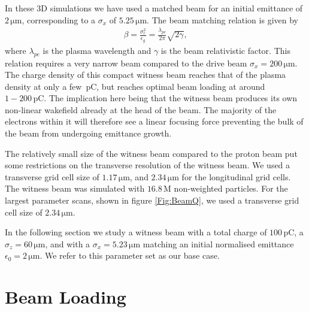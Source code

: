 \documentclass[aps,prstab,reprint,amsmath,amssymb,groupedaddress]{revtex4-1}
\newcommand{\unit}[1]{\,\mathrm{#1}}
\begin{document}
In these 3D simulations we have used a matched beam for an initial emittance of $2\unit{\mu m}$, corresponding to a
$\sigma_{x}$ of $5.25\unit{\mu m}$. The beam matching relation is given by
\begin{align}
    \beta = \frac{\sigma_r^2}{\epsilon_g} = \frac{\lambda_{pe}}{2\pi}\sqrt{2\gamma}, \label{EQ:Matched}
\end{align}
where $\lambda_{pe}$ is the plasma wavelength and $\gamma$ is the beam relativistic factor. This relation requires a
very narrow beam compared to the drive beam $\sigma_{x} = 200\unit{\mu m}$. The charge density of this compact witness
beam reaches that of the plasma density at only a few $\unit{pC}$, but reaches optimal beam loading at around
$1-200\unit{pC}$. The implication here being that the witness beam produces its own non-linear wakefield already at the
head of the beam. The majority of the electrons within it will therefore see a linear focusing force preventing the bulk
of the beam from undergoing emittance growth.

The relatively small size of the witness beam compared to the proton beam put some restrictions on the transverse
resolution of the witness beam. We used a transverse grid cell size of $1.17\unit{\mu m}$, and $2.34\unit{\mu m}$ for
the longitudinal grid cells. The witness beam was simulated with $16.8\unit{M}$ non-weighted particles. For the largest
parameter scans, shown in figure \ref{Fig:BeamQ}, we used a transverse grid cell size of $2.34\unit{\mu m}$.

In the following section we study a witness beam with a total charge of $100\unit{pC}$, a $\sigma_{z}=60\unit{\mu m}$,
and with a $\sigma_{x}=5.23\unit{\mu m}$ matching an initial normalised emittance $\epsilon_{0} = 2\unit{\mu m}$. We
refer to this parameter set as our base case.

\section[\label{S:BL}]{Beam Loading}
\end{document}
